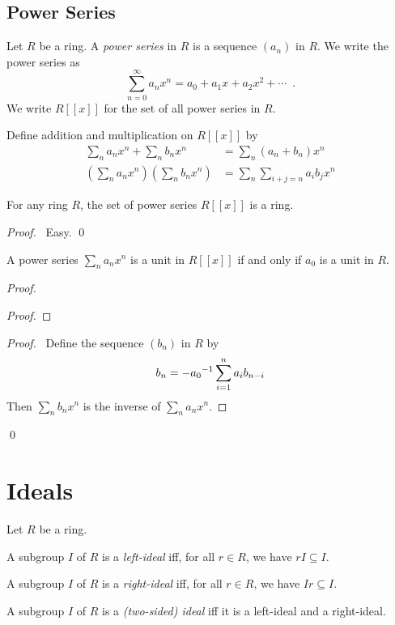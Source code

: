 \section{Power Series}

\begin{df}
Let $R$ be a ring. A \emph{power series} in $R$ is a sequence $(a_n)$ in $R$. We write the power series as
\[ \sum_{n=0}^{\infty} a_n x^n = a_0 + a_1 x + a_2 x^2 + \cdots \enspace . \]
We write $R[[x]]$ for the set of all power series in $R$.

Define addition and multiplication on $R[[x]]$ by
\begin{align*}
\sum_n a_n x^n + \sum_n b_n x^n & = \sum_n (a_n + b_n) x^n \\
\left( \sum_n a_n x^n \right) \left( \sum_n b_n x^n \right) & = \sum_n \sum_{i+j=n} a_i b_j x^n
\end{align*}
\end{df}

\begin{prop}
For any ring $R$, the set of power series $R[[x]]$ is a ring.
\end{prop}

\begin{proof}
\pf\ Easy. \qed
\end{proof}

\begin{prop}
A power series $\sum_n a_n x^n$ is a unit in $R[[x]]$ if and only if $a_0$ is a unit in $R$.
\end{prop}

\begin{proof}
\pf
{}
\begin{proof}
\end{proof}
\begin{proof}
	\pf\ Define the sequence $(b_n)$ in $R$ by
	\[ b_n = - {a_0}^{-1} \sum_{i=1}^n a_i b_{n-i} \]
	Then $\sum_n b_n x^n$ is the inverse of $\sum_n a_n x^n$.
\end{proof}
\qed
\end{proof}

\chapter{Ideals}

\begin{df}
Let $R$ be a ring.

A subgroup $I$ of $R$ is a \emph{left-ideal} iff, for all $r \in R$, we have $rI \subseteq I$.

A subgroup $I$ of $R$ is a \emph{right-ideal} iff, for all $r \in R$, we have $Ir \subseteq I$.

A subgroup $I$ of $R$ is a \emph{(two-sided) ideal} iff it is a left-ideal and a right-ideal.
\end{df}

